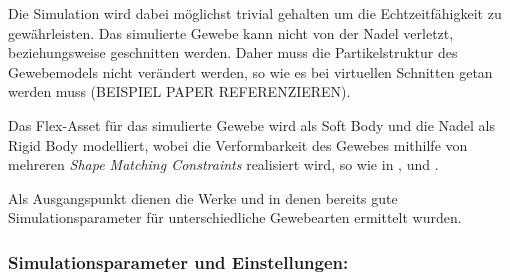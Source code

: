 Die Simulation wird dabei möglichst trivial gehalten um die Echtzeitfähigkeit zu gewährleisten. Das simulierte Gewebe kann nicht von der Nadel verletzt, beziehungsweise geschnitten werden. Daher muss die Partikelstruktur des Gewebemodels nicht verändert werden, so wie es bei virtuellen Schnitten getan werden muss (BEISPIEL PAPER REFERENZIEREN).

Das Flex-Asset für das simulierte Gewebe wird als Soft Body und die Nadel als Rigid Body modelliert, wobei die Verformbarkeit des Gewebes mithilfe von mehreren \textit{Shape Matching Constraints} realisiert wird, so wie in \cite{UPP}, \cite{BreastBiopsy} und \cite{PBDKidney}. 

Als Ausgangspunkt dienen die Werke \cite{PBDKidney} und \cite{BreastBiopsy} in denen bereits gute Simulationsparameter für unterschiedliche Gewebearten ermittelt wurden.

\subsubsection{Simulationsparameter und Einstellungen: }    

